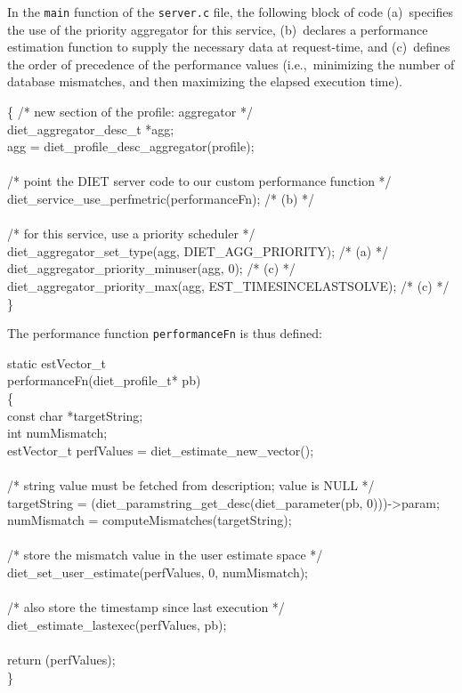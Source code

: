 In the \texttt{main} function of the \texttt{server.c} file, the
following block of code (a)~specifies the use of the priority
aggregator for this service, (b)~declares a performance estimation
function to supply the necessary data at request-time, and
(c)~defines the order of precedence of the performance values
(i.e.,~minimizing the number of database mismatches, and then
maximizing the elapsed execution time).
\begin{code}
  \{
    /* new section of the profile: aggregator */ \\
    diet\_aggregator\_desc\_t *agg; \\
    agg = diet\_profile\_desc\_aggregator(profile); \\
\\
    /* point the DIET server code to our custom performance function */ \\
    diet\_service\_use\_perfmetric(performanceFn);                 /* (b) */ \\
\\
    /* for this service, use a priority scheduler */ \\
    diet\_aggregator\_set\_type(agg, DIET\_AGG\_PRIORITY);         /* (a) */ \\
    diet\_aggregator\_priority\_minuser(agg, 0);                   /* (c) */ \\
    diet\_aggregator\_priority\_max(agg, EST\_TIMESINCELASTSOLVE); /* (c) */ \\
  \}
\end{code}
The performance function \texttt{performanceFn} is thus defined:
\begin{code}
static estVector\_t \\
performanceFn(diet\_profile\_t* pb) \\
\{ \\
  const char *targetString; \\
  int numMismatch; \\
  estVector\_t perfValues = diet\_estimate\_new\_vector(); \\
\\
  /* string value must be fetched from description; value is NULL */ \\
  targetString = (diet\_paramstring\_get\_desc(diet\_parameter(pb, 0)))->param; \\
  numMismatch = computeMismatches(targetString); \\
\\
  /* store the mismatch value in the user estimate space */ \\
  diet\_set\_user\_estimate(perfValues, 0, numMismatch); \\
\\
  /* also store the timestamp since last execution */ \\
  diet\_estimate\_lastexec(perfValues, pb); \\
\\
  return (perfValues); \\
\}
\end{code}
